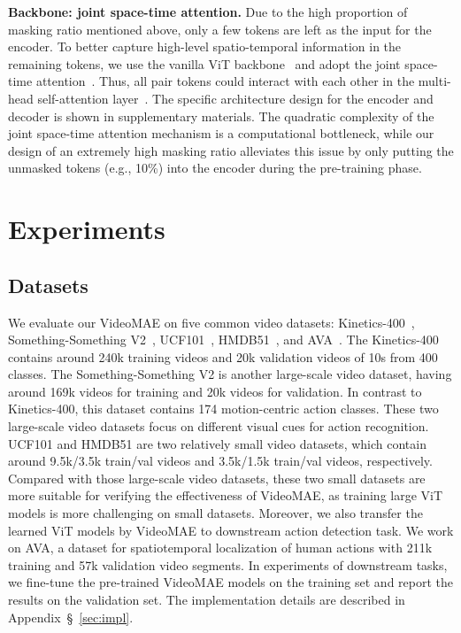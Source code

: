 \documentclass{article}
\begin{document}
\par{\noindent \textbf{Backbone: joint space-time attention.}} Due to the high proportion of masking ratio mentioned above, only a few tokens are left as the input for the encoder. To better capture high-level spatio-temporal information in the remaining tokens, we use the vanilla ViT backbone~\cite{vit} and adopt the joint space-time attention~\cite{vivit,liu2021video}. Thus, all pair tokens could interact with each other in the multi-head self-attention layer~\cite{attention}. 
The specific architecture design for the encoder and decoder is shown in supplementary materials.
The quadratic complexity of the joint space-time attention mechanism is a computational bottleneck, while our design of an extremely high masking ratio alleviates this issue by only putting the unmasked tokens (e.g., 10\%) into the encoder during the pre-training phase.

\section{Experiments}
\subsection{Datasets}
\label{sec:data}
We evaluate our VideoMAE on five common video datasets: Kinetics-400~\cite{kinetics400}, Something-Something V2~\cite{sth}, UCF101~\cite{ucf}, HMDB51~\cite{hmdb}, and AVA~\cite{ava}. 
The Kinetics-400 contains around 240k training videos and 20k validation videos of 10s from 400 classes. 
The Something-Something V2 is another large-scale video dataset, having around 169k videos for training and 20k videos for validation. In contrast to Kinetics-400, this dataset contains 174 motion-centric action classes. These two large-scale video datasets focus on different visual cues for action recognition. 
UCF101 and HMDB51 are two relatively small video datasets, which contain around 9.5k/3.5k train/val videos and 3.5k/1.5k train/val videos, respectively. Compared with those large-scale video datasets, these two small datasets are more suitable for verifying the effectiveness of VideoMAE, as training large ViT models is more challenging on small datasets. 
Moreover, we also transfer the learned ViT models by VideoMAE to downstream action detection task. We work on AVA, a dataset for spatiotemporal localization of human actions with 211k training and 57k validation video segments.
In experiments of downstream tasks, we fine-tune the pre-trained VideoMAE models on the training set and report the results on the validation set. The implementation details are described in Appendix~\S~\ref{sec:impl}.
\end{document}
